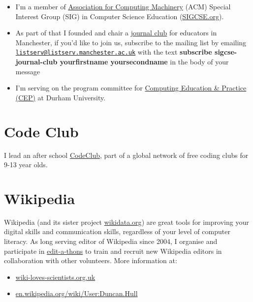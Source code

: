 \documentclass[12pt,]{book}
\providecommand{\tightlist}{%
  \setlength{\itemsep}{0pt}\setlength{\parskip}{0pt}}
\begin{document}
\begin{itemize}
\tightlist
\item
  I'm a member of \href{https://en.wikipedia.org/wiki/Association_for_Computing_Machinery}{Association for Computing Machinery} (ACM) Special Interest Group (SIG) in Computer Science Education (\href{https://sigcse.org}{SIGCSE.org}).
\item
  As part of that I founded and chair a \href{https://duncan.hull.name/2019/07/17/sigcse-journal-club/}{journal club} for educators in Manchester, if you'd like to join us, subscribe to the mailing list by emailing \href{mailto:listserv@listserv.manchester.ac.uk}{\nolinkurl{listserv@listserv.manchester.ac.uk}} with the text \textbf{subscribe sigcse-journal-club yourfirstname yoursecondname} in the body of your message
\item
  I'm serving on the program committee for \href{http://community.dur.ac.uk/cep.conference}{Computing Education \& Practice (CEP)} at Durham University.
\end{itemize}

\hypertarget{code-club}{%
\section{Code Club}\label{code-club}}

I lead an after school \href{https://codeclub.org}{CodeClub}, part of a global network of free coding clubs for 9-13 year olds.

\hypertarget{wikipedia}{%
\section{Wikipedia}\label{wikipedia}}

Wikipedia (and its sister project \href{https://www.wikidata.org}{wikidata.org}) are great tools for improving your digital skills and communication skills, regardless of your level of computer literacy. As long serving editor of Wikipedia since 2004, I organise and participate in \href{https://en.wikipedia.org/wiki/Edit-a-thon}{edit-a-thons} to train and recruit new Wikipedia editors in collaboration with other volunteers. More information at:

\begin{itemize}
\tightlist
\item
  \href{https://wiki-loves-scientists.org.uk/}{wiki-loves-scientists.org.uk}
\item
  \href{https://en.wikipedia.org/wiki/User:Duncan.Hull}{en.wikipedia.org/wiki/User:Duncan.Hull}
\end{itemize}
\end{document}
